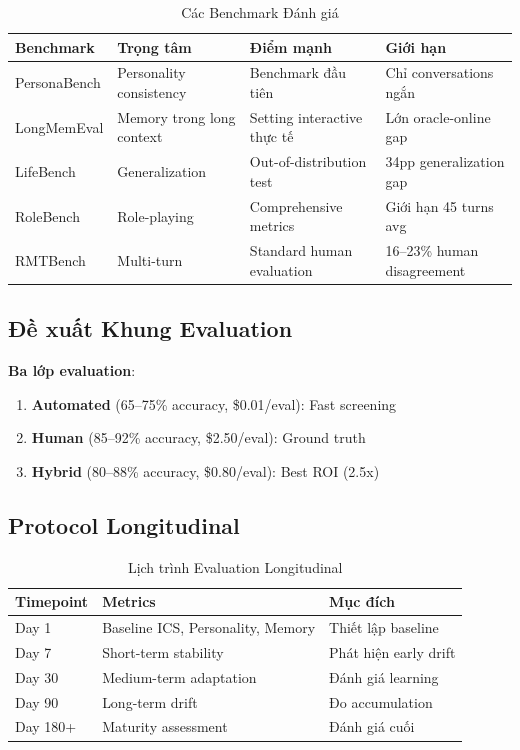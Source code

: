 \documentclass[10pt,leqno]{amsart}
\begin{document}
\begin{table}[H]
\centering
\caption{Các Benchmark Đánh giá}
\label{tab:benchmarks}
\begin{tabular}{llll}
\toprule
\textbf{Benchmark} & \textbf{Trọng tâm} & \textbf{Điểm mạnh} & \textbf{Giới hạn} \\
\midrule
PersonaBench & Personality consistency & Benchmark đầu tiên & Chỉ conversations ngắn \\
LongMemEval & Memory trong long context & Setting interactive thực tế & Lớn oracle-online gap \\
LifeBench & Generalization & Out-of-distribution test & 34pp generalization gap \\
RoleBench & Role-playing & Comprehensive metrics & Giới hạn 45 turns avg \\
RMTBench & Multi-turn & Standard human evaluation & 16--23\% human disagreement \\
\bottomrule
\end{tabular}
\end{table}

\subsection{Đề xuất Khung Evaluation}

\textbf{Ba lớp evaluation}:
\begin{enumerate}
    \item \textbf{Automated} (65--75\% accuracy, \$0.01/eval): Fast screening
    \item \textbf{Human} (85--92\% accuracy, \$2.50/eval): Ground truth
    \item \textbf{Hybrid} (80--88\% accuracy, \$0.80/eval): Best ROI (2.5x)
\end{enumerate}

\subsection{Protocol Longitudinal}

\begin{table}[H]
\centering
\caption{Lịch trình Evaluation Longitudinal}
\label{tab:longitudinal-protocol}
\begin{tabular}{lll}
\toprule
\textbf{Timepoint} & \textbf{Metrics} & \textbf{Mục đích} \\
\midrule
Day 1 & Baseline ICS, Personality, Memory & Thiết lập baseline \\
Day 7 & Short-term stability & Phát hiện early drift \\
Day 30 & Medium-term adaptation & Đánh giá learning \\
Day 90 & Long-term drift & Đo accumulation \\
Day 180+ & Maturity assessment & Đánh giá cuối \\
\bottomrule
\end{tabular}
\end{table}
\end{document}
